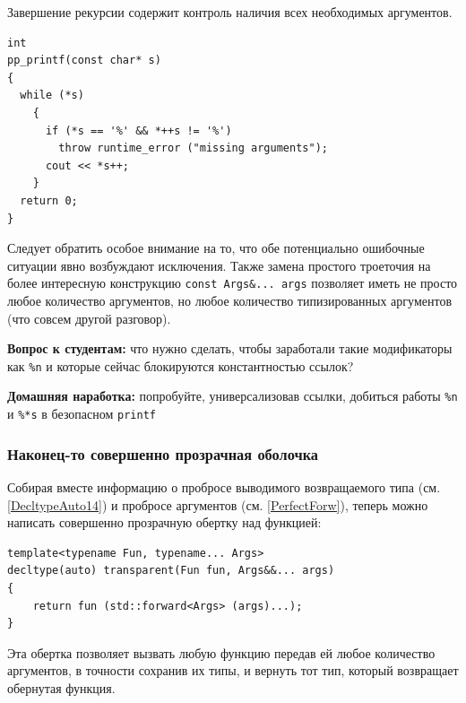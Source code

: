 \documentclass[a4paper,12pt,oneside]{article}
\newif\ifanswers
\begin{document}
Завершение рекурсии содержит контроль наличия всех необходимых аргументов.

\begin{lstlisting}
int
pp_printf(const char* s) 
{
  while (*s) 
    {
      if (*s == '%' && *++s != '%')
        throw runtime_error ("missing arguments");
      cout << *s++;
    }
  return 0;
}
\end{lstlisting}

Следует обратить особое внимание на то, что обе потенциально ошибочные ситуации явно возбуждают исключения. Также замена простого троеточия на более интересную конструкцию \lstinline!const Args&... args! позволяет иметь не просто любое количество аргументов, но любое количество типизированных аргументов (что совсем другой разговор).

\textbf{Вопрос к студентам:} что нужно сделать, чтобы заработали такие модификаторы как \lstinline!%n! и которые сейчас блокируются константностью ссылок?

\ifanswers
Правильный ответ: универсализовать ссылки

\begin{lstlisting}
template<typename T, typename... Args> int
pp_printf(const char* s, T&& value, Args&&... args)
\end{lstlisting}
\fi

\textbf{Домашняя наработка:} попробуйте, универсализовав ссылки, добиться работы \lstinline!%n! и \lstinline!%*s! в безопасном \lstinline!printf!

\subsubsection{Наконец-то совершенно прозрачная оболочка}\label{PerfectCloth}

Собирая вместе информацию о пробросе выводимого возвращаемого типа (см. \ref{DecltypeAuto14}) и пробросе аргументов (см. \ref{PerfectForw}), теперь можно написать совершенно прозрачную обертку над функцией:

\begin{lstlisting}
template<typename Fun, typename... Args>
decltype(auto) transparent(Fun fun, Args&&... args) 
{ 
    return fun (std::forward<Args> (args)...); 
}
\end{lstlisting}

Эта обертка позволяет вызвать любую функцию передав ей любое количество аргументов, в точности сохранив их типы, и вернуть тот тип, который возвращает обернутая функция.
\end{document}
